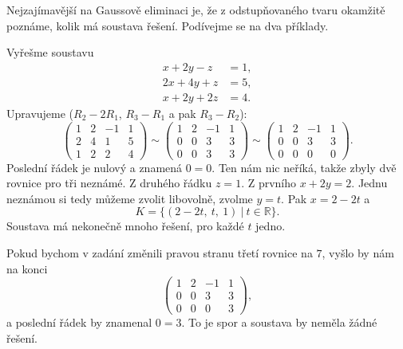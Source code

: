 Nejzajímavější na Gaussově eliminaci je, že z odstupňovaného tvaru okamžitě poznáme, kolik má soustava řešení. Podívejme se na dva příklady.

\begin{example}\label{ex:gauss-nekonecne}
  Vyřešme soustavu
  \begin{align*}
    x + 2y - z &= 1,\\
    2x + 4y + z &= 5,\\
    x + 2y + 2z &= 4.
  \end{align*}
  Upravujeme ($R_2 - 2R_1$, $R_3 - R_1$ a pak $R_3 - R_2$):
  \begin{equation*}
    \left(\begin{array}{rrr|r}
      1 & 2 & -1 & 1\\
      2 & 4 & 1 & 5\\
      1 & 2 & 2 & 4
    \end{array}\right)
    \sim
    \left(\begin{array}{rrr|r}
      1 & 2 & -1 & 1\\
      0 & 0 & 3 & 3\\
      0 & 0 & 3 & 3
    \end{array}\right)
    \sim
    \left(\begin{array}{rrr|r}
      1 & 2 & -1 & 1\\
      0 & 0 & 3 & 3\\
      0 & 0 & 0 & 0
    \end{array}\right).
  \end{equation*}
  Poslední řádek je nulový a znamená $0 = 0$. Ten nám nic neříká, takže zbyly dvě rovnice pro tři neznámé. Z druhého řádku $z = 1$. Z prvního $x + 2y = 2$. Jednu neznámou si tedy můžeme zvolit libovolně, zvolme $y = t$. Pak $x = 2 - 2t$ a
  \begin{equation*}
    K = \{(2 - 2t,\ t,\ 1)\ |\ t\in\mathbb{R}\}.
  \end{equation*}
  Soustava má nekonečně mnoho řešení, pro každé $t$ jedno.

  Pokud bychom v zadání změnili pravou stranu třetí rovnice na $7$, vyšlo by nám na konci
  \begin{equation*}
    \left(\begin{array}{rrr|r}
      1 & 2 & -1 & 1\\
      0 & 0 & 3 & 3\\
      0 & 0 & 0 & 3
    \end{array}\right),
  \end{equation*}
  a poslední řádek by znamenal $0 = 3$. To je spor a soustava by neměla žádné řešení.
\end{example}

